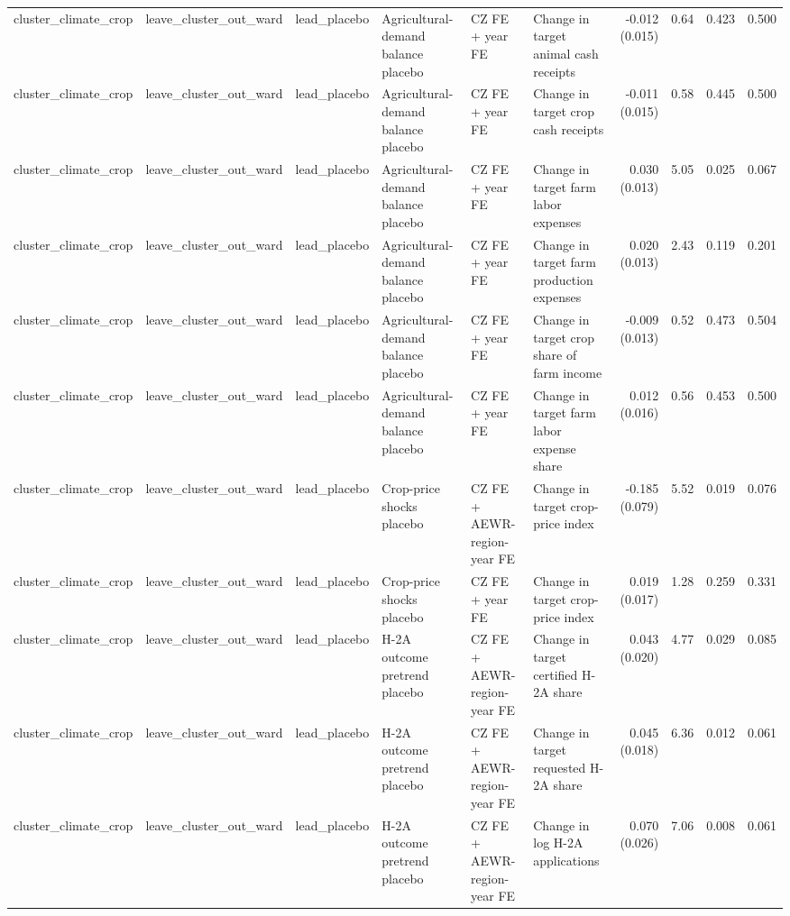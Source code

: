 \begin{tabular}{llllllrrrr}
cluster_climate_crop & leave_cluster_out_ward & lead_placebo & Agricultural-demand balance placebo & CZ FE + year FE & Change in target animal cash receipts & -0.012 (0.015) & 0.64 & 0.423 & 0.500 \\
cluster_climate_crop & leave_cluster_out_ward & lead_placebo & Agricultural-demand balance placebo & CZ FE + year FE & Change in target crop cash receipts & -0.011 (0.015) & 0.58 & 0.445 & 0.500 \\
cluster_climate_crop & leave_cluster_out_ward & lead_placebo & Agricultural-demand balance placebo & CZ FE + year FE & Change in target farm labor expenses & 0.030 (0.013) & 5.05 & 0.025 & 0.067 \\
cluster_climate_crop & leave_cluster_out_ward & lead_placebo & Agricultural-demand balance placebo & CZ FE + year FE & Change in target farm production expenses & 0.020 (0.013) & 2.43 & 0.119 & 0.201 \\
cluster_climate_crop & leave_cluster_out_ward & lead_placebo & Agricultural-demand balance placebo & CZ FE + year FE & Change in target crop share of farm income & -0.009 (0.013) & 0.52 & 0.473 & 0.504 \\
cluster_climate_crop & leave_cluster_out_ward & lead_placebo & Agricultural-demand balance placebo & CZ FE + year FE & Change in target farm labor expense share & 0.012 (0.016) & 0.56 & 0.453 & 0.500 \\
cluster_climate_crop & leave_cluster_out_ward & lead_placebo & Crop-price shocks placebo & CZ FE + AEWR-region-year FE & Change in target crop-price index & -0.185 (0.079) & 5.52 & 0.019 & 0.076 \\
cluster_climate_crop & leave_cluster_out_ward & lead_placebo & Crop-price shocks placebo & CZ FE + year FE & Change in target crop-price index & 0.019 (0.017) & 1.28 & 0.259 & 0.331 \\
cluster_climate_crop & leave_cluster_out_ward & lead_placebo & H-2A outcome pretrend placebo & CZ FE + AEWR-region-year FE & Change in target certified H-2A share & 0.043 (0.020) & 4.77 & 0.029 & 0.085 \\
cluster_climate_crop & leave_cluster_out_ward & lead_placebo & H-2A outcome pretrend placebo & CZ FE + AEWR-region-year FE & Change in target requested H-2A share & 0.045 (0.018) & 6.36 & 0.012 & 0.061 \\
cluster_climate_crop & leave_cluster_out_ward & lead_placebo & H-2A outcome pretrend placebo & CZ FE + AEWR-region-year FE & Change in log H-2A applications & 0.070 (0.026) & 7.06 & 0.008 & 0.061 \\

\end{tabular}
